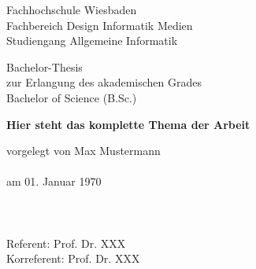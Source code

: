 
\begin{titlepage}
  \textwidth170mm
  \enlargethispage{3cm}
  \setlength{\parindent}{0em}
\begin{minipage}{\textwidth}
    \centering
    \vspace{0.8cm}
    \begin{large}Fachhochschule Wiesbaden\\
    Fachbereich Design Informatik Medien\\
    Studiengang Allgemeine Informatik\end{large}
\end{minipage}
\begin{minipage}{\textwidth}
    \centering
    \vspace{0.8cm}
   \begin{large} 
Bachelor-Thesis\\
    zur Erlangung des akademischen Grades\\
    Bachelor of Science (B.Sc.)
\end{large}
    
    
    \vspace{4cm}

    \renewcommand{\baselinestretch}{1.8}
    \small\normalsize
    {\LARGE \bf Hier steht das komplette Thema der Arbeit}\\

    \renewcommand{\baselinestretch}{1}
    \small\normalsize

  \end{minipage}

  \vspace{6.5cm}
  vorgelegt von Max Mustermann\\
  \\
  am 01. Januar 1970\\
  \\
  \\
  \\
	Referent: Prof. Dr. XXX\\
	Korreferent: Prof. Dr. XXX
  \clearpage
\end{titlepage}